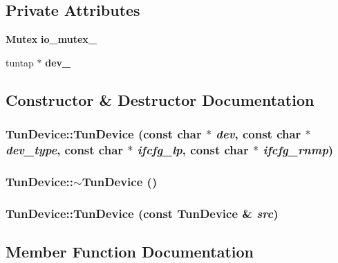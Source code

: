 \subsection*{Private Attributes}
\begin{CompactItemize}
\item 
{\bf Mutex} {\bf io\_\-mutex\_\-}
\item 
tuntap $\ast$ {\bf dev\_\-}
\end{CompactItemize}


\subsection{Constructor \& Destructor Documentation}
\subsubsection{\setlength{\rightskip}{0pt plus 5cm}Tun\-Device::Tun\-Device (const char $\ast$ {\em dev}, const char $\ast$ {\em dev\_\-type}, const char $\ast$ {\em ifcfg\_\-lp}, const char $\ast$ {\em ifcfg\_\-rnmp})}\label{classTunDevice_d6914bd3a45e03ffe95676ac4420154a}


\subsubsection{\setlength{\rightskip}{0pt plus 5cm}Tun\-Device::$\sim$Tun\-Device ()}\label{classTunDevice_2c6196d270bf4d0e99ff4f860391faed}


\subsubsection{\setlength{\rightskip}{0pt plus 5cm}Tun\-Device::Tun\-Device (const {\bf Tun\-Device} \& {\em src})\hspace{0.3cm}{\tt  [private]}}\label{classTunDevice_4587b54228b4240334ad4614211df394}




\subsection{Member Function Documentation}
